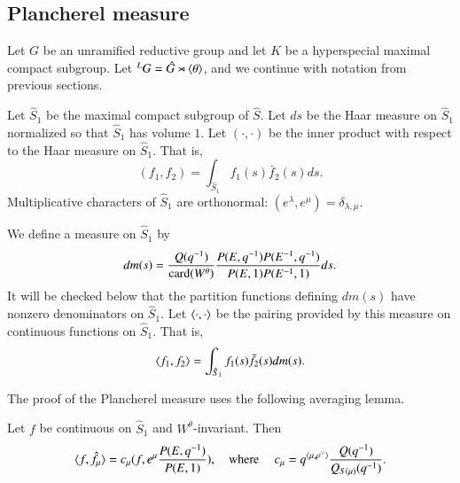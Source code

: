 \subsection{Plancherel measure}

Let $G$ be an unramified reductive group and let $K$ be a hyperspecial maximal compact subgroup.
Let ${}^LG = \hat G\rtimes \langle{\theta}\rangle$, and we continue with notation from previous sections.

Let $\hat S_1$ be the maximal compact subgroup of $\hat S$.  Let $ds$ be the Haar measure on $\hat S_1$ normalized
so that $\hat S_1$ has volume $1$.
Let $(\cdot,\cdot)$ be the inner product with respect to the Haar  measure on $\hat S_1$. That is,
\[
(f_1,f_2) = \int_{\hat S_1} f_1(s) \bar f_2(s) ds.
\]
Multiplicative characters of $\hat S_1$ are orthonormal: $(e^\lambda,e^\mu) = \delta_{\lambda,\mu}$.  


We define a measure on $\hat S_1$ by
\[
dm(s) = \frac{Q(q^{-1})}{{\operatorname{card}}(W^\theta)}\frac{P(E,q^{-1}) P(E^{-1},q^{-1})}{P(E,1) P(E^{-1},1)} ds.
\]
It will be checked below that
the partition functions defining 
$dm(s)$
have nonzero  denominators on $\hat S_1$.
Let $\langle{\cdot,\cdot}\rangle$ be the pairing provided by this measure on continuous functions on $\hat S_1$.
That is, 
\[
\langle{f_1,f_2}\rangle = \int_{\hat S_1} f_1(s) \bar f_2(s) dm(s).
\]

The proof of the Plancherel measure uses the following averaging lemma.

\begin{lemma}\label{lemma:average} 
Let $f$ be continuous on $\hat S_1$ and $W^\theta$-invariant.
Then
\[
\langle{f,\hat f_\mu}\rangle = c_\mu  (f, e^\mu\frac{ P(E,q^{-1})}{P(E,1)}),
\quad\text{where }\quad
c_\mu = q^{\langle{\mu,\rho^\vee}\rangle}\frac{ Q(q^{-1})}{Q_{S(\mu)}(q^{-1})}.
\]
\end{lemma}

